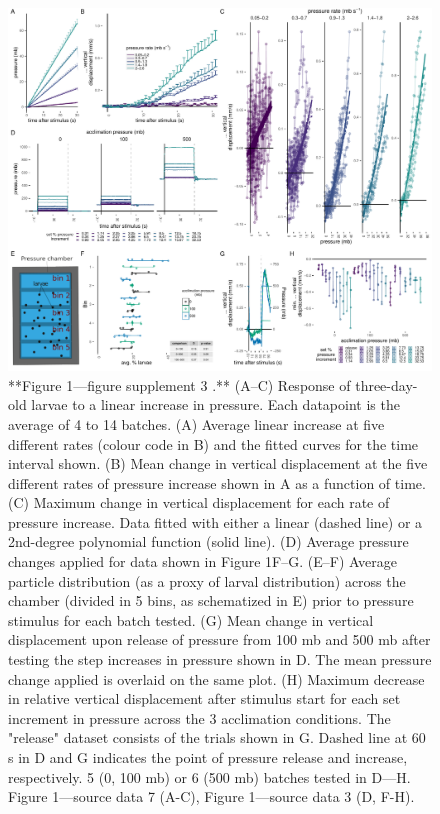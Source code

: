 \documentclass[
]{article}
\begin{document}
\begin{figure}
\includegraphics[width=48.61in]{Figures/Figure1-FigureSupplement3} \caption{**Figure 1—figure supplement 3 .** (A–C) Response of three-day-old larvae to a linear increase in pressure.  Each datapoint is the average of 4 to 14 batches. (A) Average linear increase at five different rates (colour code in B) and the fitted curves for the time interval shown. (B) Mean change in vertical displacement at the five different rates of pressure increase shown in A as a function of time. (C) Maximum change in vertical displacement for each rate of pressure increase. Data fitted with either a linear (dashed line) or a 2nd-degree polynomial function (solid line). (D) Average pressure changes applied for data shown in Figure 1F–G. (E–F) Average particle distribution (as a proxy of larval distribution) across the chamber (divided in 5 bins, as schematized in E) prior to pressure stimulus for each batch tested.  (G) Mean change in vertical displacement upon release of pressure from 100 mb and 500 mb after testing the step increases in pressure shown in D. The mean pressure change applied is overlaid on the same plot. (H) Maximum decrease in relative vertical displacement after stimulus start for each set increment in pressure across the 3 acclimation conditions. The "release" dataset consists of the trials shown in G.  Dashed line at 60 s in D and G indicates the point of pressure release and increase, respectively. 5 (0, 100 mb) or 6 (500 mb) batches tested in D—H. Figure 1---source data 7 (A-C), Figure 1---source data 3 (D, F-H).  }\label{fig:unnamed-chunk-9}
\end{figure}
\end{document}
